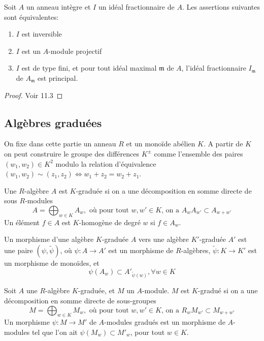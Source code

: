 \begin{thm}\label{ideauxinversibles}
Soit $A$ un anneau intègre et $I$ un idéal fractionnaire de $A$. Les assertions suivantes sont équivalentes:
\begin{enumerate}
\item $I$ est inversible
\item $I$ est un $A$-module projectif
\item $I$ est de type fini, et pour tout idéal maximal $\mathfrak{m}$ de $A$, l'idéal fractionnaire $I_\mathfrak{m}$ de $A_\mathfrak{m}$ est principal.
\end{enumerate}
\end{thm}
\begin{proof}
Voir \cite{Matsumura} 11.3
\end{proof}

\subsection{Algèbres graduées}

On fixe dans cette partie un anneau $R$ et un monoïde abélien $K$. A partir de $K$ on peut construire le groupe des différences $K^{\pm}$ comme l'ensemble des paires $(w_1,w_2)\in K^2$ modulo la relation d'équivalence $(w_1,w_2)\sim (z_1,z_2)\iff w_1+z_2=w_2+z_1$. 

\begin{defn}
Une $R$-algèbre $A$ est $K$-graduée si on a une décomposition en somme directe de sous $R$-modules 
$$A=\bigoplus_{w\in K}A_w,\text{ où pour tout } w,w'\in K\text{, on a }A_wA_{w'}\subset A_{w+w'}$$
Un élément $f\in A$ est $K$-homogène de degré $w$ si $f\in A_w$.

Un morphisme d'une algèbre $K$-graduée $A$ vers une algèbre $K'$-graduée $A'$ est une paire $(\psi,\widetilde{\psi})$, où $\psi:A\rightarrow A'$ est un morphisme de $R$-algèbres, $\widetilde{\psi}:K\rightarrow K'$ est un morphisme de monoïdes, et
$$\psi(A_w)\subset A'_{\widetilde{\psi}(w)}, \forall w\in K$$  
\end{defn}

\begin{defn}
Soit $A$ une $R$-algèbre $K$-graduée, et $M$ un $A$-module. $M$ est $K$-gradué si on a une décomposition en somme directe de sous-groupes
$$M=\bigoplus_{w\in K}M_w,\text{ où pour tout } w,w'\in K\text{, on a }R_wM_{w'}\subset M_{w+w'}$$
Un morphisme $\psi:M\rightarrow M'$ de $A$-modules gradués est un morphisme de $A$-modules tel que l'on ait $\psi(M_w)\subset M'_w$, pour tout $w\in K$.
\end{defn}

